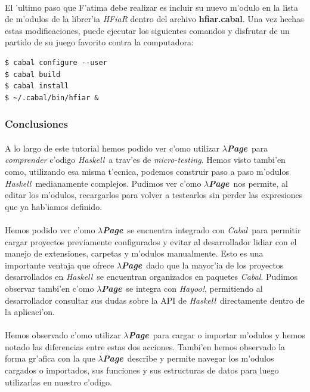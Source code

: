 \documentclass[a4paper]{article}
\newcommand{\haskell}{\textsl{Haskell}}
\newcommand{\hpage}{\textbf{\textsl{$\lambda$Page}}}
\newcommand{\cabal}{\textsl{Cabal}}
\begin{document}
\paragraph{}El 'ultimo paso que F'atima debe realizar es incluir su nuevo m'odulo en la lista de m'odulos de la librer'ia \textsl{HFiaR} dentro del archivo \textbf{hfiar.cabal}.  Una vez hechas estas modificaciones, puede ejecutar los siguientes comandos y disfrutar de un partido de su juego favorito contra la computadora:
\lstset{language=sh, frame=single, tabsize=4}
\begin{center}\begin{lstlisting}
$ cabal configure --user
$ cabal build
$ cabal install
$ ~/.cabal/bin/hfiar &
\end{lstlisting}\end{center}

\newpage
\subsubsection{Conclusiones}
\paragraph{}A lo largo de este tutorial hemos podido ver c'omo utilizar \hpage\ para \textsl{comprender} c'odigo \haskell\ a trav'es de \textsl{micro-testing}.  Hemos visto tambi'en como, utilizando esa misma t'ecnica, podemos construir paso a paso m'odulos \haskell\ medianamente complejos.  Pudimos ver c'omo \hpage\ nos permite, al editar los m'odulos, recargarlos para volver a testearlos sin perder las expresiones que ya hab'iamos definido.
\paragraph{}Hemos podido ver c'omo \hpage\ se encuentra integrado con \cabal\ para permitir cargar proyectos previamente configurados y evitar al desarrollador lidiar con el manejo de extensiones, carpetas y m'odulos manualmente.  Esto es una importante ventaja que ofrece \hpage\, dado que la mayor'ia de los proyectos desarrollados en \haskell\ se encuentran organizados en paquetes \cabal.  Pudimos observar tambi'en c'omo \hpage\ se integra con \textsl{Hayoo!}, permitiendo al desarrollador consultar sus dudas sobre la API de \haskell\ directamente dentro de la aplicaci'on.
\paragraph{}Hemos observado c'omo utilizar \hpage\ para cargar o importar m'odulos y hemos notado las diferencias entre estas dos acciones.  Tambi'en hemos observado la forma gr'afica con la que \hpage\ describe y permite navegar los m'odulos cargados o importados, sus funciones y sus estructuras de datos para luego utilizarlas en nuestro c'odigo.
\end{document}
